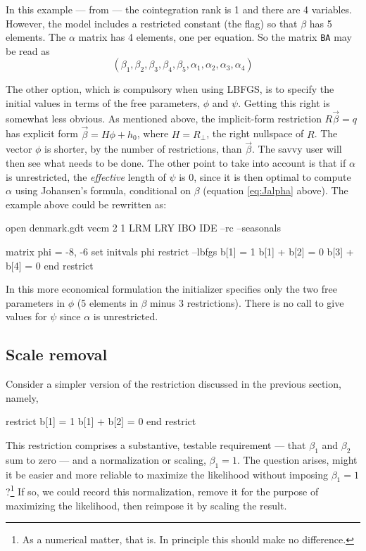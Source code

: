 In this example --- from \cite{johansen95} --- the cointegration rank is
1 and there are 4 variables.  However, the model includes a restricted
constant (the  flag) so that $\beta$ has 5 elements.  The
$\alpha$ matrix has 4 elements, one per equation.  So the matrix
\texttt{BA} may be read as
\[
\left(\beta_1, \beta_2, \beta_3, \beta_4, \beta_5,
 \alpha_1, \alpha_2, \alpha_3, \alpha_4 \right)
\]

The other option, which is compulsory when using LBFGS, is to specify
the initial values in terms of the free parameters, $\phi$ and $\psi$.
Getting this right is somewhat less obvious.  As mentioned above, the
implicit-form restriction $R\vec{\beta} = q$ has explicit form
$\vec{\beta} = H\phi + h_0$, where $H = R_{\perp}$, the right
nullspace of $R$.  The vector $\phi$ is shorter, by the number of
restrictions, than $\vec{\beta}$.  The savvy user will then see what
needs to be done.  The other point to take into account is that if
$\alpha$ is unrestricted, the \textit{effective} length of $\psi$ is
0, since it is then optimal to compute $\alpha$ using Johansen's
formula, conditional on $\beta$ (equation \ref{eq:Jalpha} above).  The
example above could be rewritten as:
\begin{code}
open denmark.gdt
vecm 2 1 LRM LRY IBO IDE --rc --seasonals

matrix phi = {-8, -6}
set initvals phi
restrict --lbfgs
  b[1] = 1
  b[1] + b[2] = 0
  b[3] + b[4] = 0
end restrict
\end{code}

In this more economical formulation the initializer specifies only the
two free parameters in $\phi$ (5 elements in $\beta$ minus 3
restrictions).  There is no call to give values for $\psi$ since
$\alpha$ is unrestricted.

\subsection{Scale removal}
\label{sec:vecm-scale-removal}

Consider a simpler version of the restriction discussed in the
previous section, namely,
%
\begin{code}
restrict
  b[1] = 1
  b[1] + b[2] = 0
end restrict
\end{code}

This restriction comprises a substantive, testable requirement ---
that $\beta_1$ and $\beta_2$ sum to zero --- and a normalization or
scaling, $\beta_1 = 1$.  The question arises, might it be easier and
more reliable to maximize the likelihood without imposing $\beta_1 =
1$?\footnote{As a numerical matter, that is.  In principle this should
  make no difference.}  If so, we could record this normalization,
remove it for the purpose of maximizing the likelihood, then reimpose
it by scaling the result.

